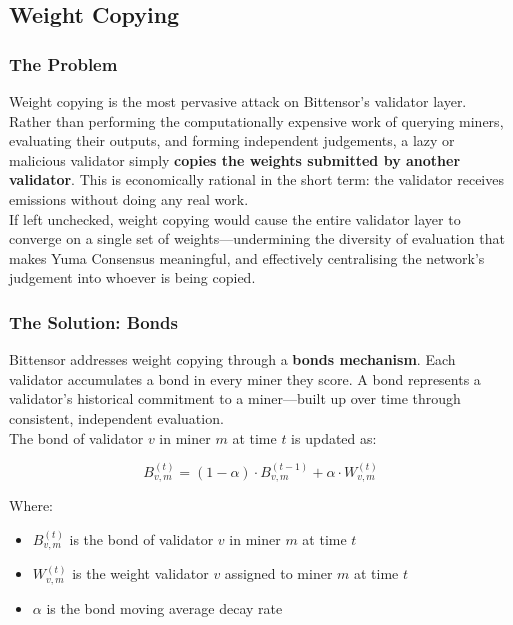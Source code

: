 \documentclass[12pt, a4paper, oneside]{report}
\theoremstyle{definition}
\begin{document}
\subsection{Weight Copying}

\subsubsection*{The Problem}

Weight copying is the most pervasive attack on Bittensor's validator layer. 
Rather than performing the computationally expensive work of querying miners, 
evaluating their outputs, and forming independent judgements, a lazy or malicious 
validator simply \textbf{copies the weights submitted by another validator}. 
This is economically rational in the short term: the validator receives emissions 
without doing any real work.\\[0.4cm]

If left unchecked, weight copying would cause the entire validator layer to 
converge on a single set of weights—undermining the diversity of evaluation that 
makes Yuma Consensus meaningful, and effectively centralising the network's 
judgement into whoever is being copied.

\subsubsection*{The Solution: Bonds}

Bittensor addresses weight copying through a \textbf{bonds mechanism}. Each 
validator accumulates a bond in every miner they score. A bond represents a 
validator's historical commitment to a miner—built up over time through 
consistent, independent evaluation.\\[0.4cm]

The bond of validator $v$ in miner $m$ at time $t$ is updated as:

\[
  B_{v,m}^{(t)} = (1 - \alpha) \cdot B_{v,m}^{(t-1)} + \alpha \cdot W_{v,m}^{(t)}
\]

Where:
\begin{itemize}
  \item $B_{v,m}^{(t)}$ is the bond of validator $v$ in miner $m$ at time $t$
  \item $W_{v,m}^{(t)}$ is the weight validator $v$ assigned to miner $m$ at time $t$
  \item $\alpha$ is the bond moving average decay rate
\end{itemize}
\end{document}
